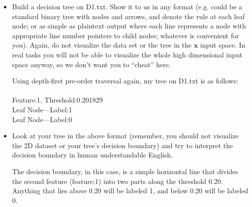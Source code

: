 \documentclass[a4paper]{article}
\theoremstyle{definition}
\def\x{\mathbf x}
\newenvironment{soln}{
    \leavevmode\color{blue}\ignorespaces
}{}
\begin{document}
\begin{enumerate}
\begin{itemize}
  \item Build a decision tree on D1.txt.  Show it to us in any format (e.g. could be a standard binary tree with nodes and arrows, and denote the rule at each leaf node; or as simple as plaintext output where each line represents a node with appropriate line number pointers to child nodes; whatever is convenient for you). Again, do not visualize the data set or the tree in the $\x$ input space.  In real tasks you will not be able to visualize the whole high dimensional input space anyway, so we don't want you to ``cheat'' here. 

  \begin{soln}
      Using depth-first pre-order traversal again, my tree on D1.txt is as follows:\\ \\
      Feature:1, Threshold:0.201829\\
      Leaf Node---Label:1\\
      Leaf Node---Label:0\\
  \end{soln}
  
  \item Look at your tree in the above format (remember, you should not visualize the 2D dataset or your tree's decision boundary) and try to interpret the decision boundary in human understandable English. \\
  \begin{soln}
      The decision boundary, in this case, is a simple horizontal line that divides the second feature (feature:1) into two parts along the threshold 0.20. Anything that lies above 0.20 will be labeled 1, and below 0.20 will be labeled 0.
  \end{soln}
  

\end{itemize}
\end{enumerate}
\end{document}
